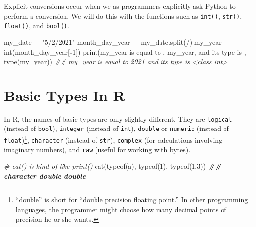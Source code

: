 \documentclass[
  12pt,
]{krantz}
\makeatletter
\newenvironment{Shaded}{\begin{snugshade}}{\end{snugshade}}
\newcommand{\BuiltInTok}[1]{#1}
\newcommand{\CommentTok}[1]{\textcolor[rgb]{0.37,0.37,0.37}{\textit{#1}}}
\newcommand{\DecValTok}[1]{\textcolor[rgb]{0.06,0.06,0.06}{#1}}
\newcommand{\DocumentationTok}[1]{\textcolor[rgb]{0.37,0.37,0.37}{\textbf{\textit{#1}}}}
\newcommand{\FloatTok}[1]{\textcolor[rgb]{0.06,0.06,0.06}{#1}}
\newcommand{\FunctionTok}[1]{\textcolor[rgb]{0,0,0}{#1}}
\newcommand{\NormalTok}[1]{#1}
\newcommand{\OperatorTok}[1]{\textcolor[rgb]{0.43,0.43,0.43}{\textbf{#1}}}
\newcommand{\StringTok}[1]{\textcolor[rgb]{0.5,0.5,0.5}{#1}}
\newenvironment{kframe}{%
\medskip{}
\setlength{\fboxsep}{.8em}
 \def\at@end@of@kframe{}%
 \ifinner\ifhmode%
  \def\at@end@of@kframe{\end{minipage}}%
  \begin{minipage}{\columnwidth}%
 \fi\fi%
 \def\FrameCommand##1{\hskip\@totalleftmargin \hskip-\fboxsep
 \colorbox{shadecolor}{##1}\hskip-\fboxsep
     \hskip-\linewidth \hskip-\@totalleftmargin \hskip\columnwidth}%
 \MakeFramed {\advance\hsize-\width
   \@totalleftmargin\z@ \linewidth\hsize
   \@setminipage}}%
 {\par\unskip\endMakeFramed%
 \at@end@of@kframe}
\renewenvironment{Shaded}{\begin{kframe}}{\end{kframe}}
\makeatother
\begin{document}
Explicit conversions occur when we as programmers explicitly ask Python to perform a conversion. We will do this with the functions such as \texttt{int()}, \texttt{str()}, \texttt{float()}, and \texttt{bool()}.

\begin{Shaded}
\begin{Highlighting}[]
\NormalTok{my\_date }\OperatorTok{=} \StringTok{"5/2/2021"}
\NormalTok{month\_day\_year }\OperatorTok{=}\NormalTok{ my\_date.split(}\StringTok{\textquotesingle{}/\textquotesingle{}}\NormalTok{)}
\NormalTok{my\_year }\OperatorTok{=} \BuiltInTok{int}\NormalTok{(month\_day\_year[}\OperatorTok{{-}}\DecValTok{1}\NormalTok{]) }
\BuiltInTok{print}\NormalTok{(}\StringTok{\textquotesingle{}my\_year is equal to \textquotesingle{}}\NormalTok{, my\_year, }\StringTok{\textquotesingle{}and its type is \textquotesingle{}}\NormalTok{, }\BuiltInTok{type}\NormalTok{(my\_year))}
\CommentTok{\#\# my\_year is equal to  2021 and its type is  \textless{}class \textquotesingle{}int\textquotesingle{}\textgreater{}}
\end{Highlighting}
\end{Shaded}

\hypertarget{basic-types-in-r}{%
\section{Basic Types In R}\label{basic-types-in-r}}

In R, the names of basic types are only slightly different. They are \texttt{logical} (instead of \texttt{bool}), \texttt{integer} (instead of \texttt{int}), \texttt{double} or \texttt{numeric} (instead of \texttt{float})\footnote{``double'' is short for ``double precision floating point.'' In other programming languages, the programmer might choose how many decimal points of precision he or she wants.}, \texttt{character} (instead of \texttt{str}), \texttt{complex} (for calculations involving imaginary numbers), and \texttt{raw} (useful for working with bytes).

\begin{Shaded}
\begin{Highlighting}[]
\CommentTok{\# cat() is kind of like print()}
\FunctionTok{cat}\NormalTok{(}\FunctionTok{typeof}\NormalTok{(}\StringTok{\textquotesingle{}a\textquotesingle{}}\NormalTok{), }\FunctionTok{typeof}\NormalTok{(}\DecValTok{1}\NormalTok{), }\FunctionTok{typeof}\NormalTok{(}\FloatTok{1.3}\NormalTok{))}
\DocumentationTok{\#\# character double double}
\end{Highlighting}
\end{Shaded}
\end{document}
